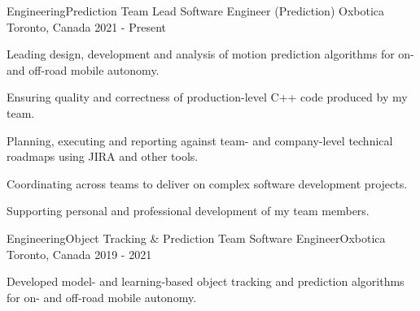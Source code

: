 

\begin{cventries}

  \cventry
    {Engineering{\enskip\cdotp\enskip}Prediction Team} %
    {Lead Software Engineer (Prediction) {\enskip\cdotp\enskip}Oxbotica} %
    {Toronto, Canada} %
    {2021 - Present} %
    {
      \begin{cvitems} %
        \item {Leading design, development and analysis of motion prediction algorithms for on- and off-road mobile autonomy.}
        \item {Ensuring quality and correctness of production-level C++ code produced by my team.}
        \item {Planning, executing and reporting against team- and company-level technical roadmaps using JIRA and other tools.}
        \item {Coordinating across teams to deliver on complex software development projects.}
        \item {Supporting personal and professional development of my team members.}
      \end{cvitems}
    }

  \cventry
    {Engineering{\enskip\cdotp\enskip}Object Tracking \& Prediction Team} %
    {Software Engineer{\enskip\cdotp\enskip}Oxbotica} %
    {Toronto, Canada} %
    {2019 - 2021} %
    {
      \begin{cvitems} %
        \item {Developed model- and learning-based object tracking and prediction algorithms for on- and off-road mobile autonomy.}
      \end{cvitems}
    }
  

\end{cventries}
